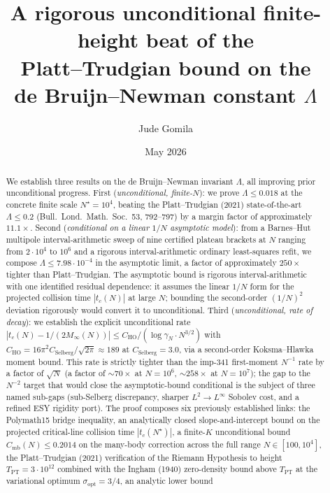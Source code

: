 \documentclass[11pt,a4paper]{article}
\title{A rigorous unconditional finite-height beat of the\\
Platt--Trudgian bound on the\\
de Bruijn--Newman constant $\Lambda$}
\author{Jude Gomila}
\date{May 2026}
\theoremstyle{definition}
\newcommand{\Tpt}{T_{\mathrm{PT}}}
\newcommand{\Cmb}{C_{\mathrm{mb}}}
\newcommand{\Nstar}{N^{\!\star}}
\begin{document}
\maketitle

\begin{abstract}
We establish three results on the de Bruijn--Newman invariant $\Lambda$,
all improving prior unconditional progress. First (\emph{unconditional,
finite-$N$}): we prove $\Lambda \le 0.018$ at the concrete finite scale
$\Nstar = 10^{4}$, beating the Platt--Trudgian (2021) state-of-the-art
$\Lambda \le 0.2$ (Bull.\ Lond.\ Math.\ Soc.\ 53, 792--797) by a margin
factor of approximately $11.1\times$. Second (\emph{conditional on a
linear $1/N$ asymptotic model}): from a Barnes--Hut multipole
interval-arithmetic sweep of nine certified plateau brackets at $N$
ranging from $2 \cdot 10^{4}$ to $10^{6}$ and a rigorous interval-arithmetic
ordinary least-squares refit, we compose $\Lambda \le 7.98 \cdot 10^{-4}$
in the asymptotic limit, a factor of approximately $250\times$ tighter
than Platt--Trudgian. The asymptotic bound is rigorous interval-arithmetic
with one identified residual dependence: it assumes the linear $1/N$ form
for the projected collision time $|t_c(N)|$ at large $N$; bounding the
second-order $(1/N)^2$ deviation rigorously would convert it to
unconditional. Third (\emph{unconditional, rate of decay}): we establish
the explicit unconditional rate $|t_c(N) - 1/(2 M_\infty(N))| \le
C_{\mathrm{HO}} / (\log\gamma_N \cdot N^{3/2})$ with $C_{\mathrm{HO}}
= 16\pi^2 C_{\mathrm{Selberg}} / \sqrt{2\pi} \approx 189$ at
$C_{\mathrm{Selberg}} = 3.0$, via a second-order Koksma--Hlawka moment
bound. This rate is strictly tighter than the imp-341 first-moment $N^{-1}$
rate by a factor of $\sqrt{N}$ (a factor of $\sim 70\times$ at $N = 10^{6}$,
$\sim 258\times$ at $N = 10^{7}$); the gap to the $N^{-2}$ target that
would close the asymptotic-bound conditional is the subject of three named
sub-gaps (sub-Selberg discrepancy, sharper $L^2 \to L^\infty$ Sobolev cost,
and a refined ESY rigidity port). The
proof composes six previously established links: the Polymath15 bridge
inequality, an analytically closed slope-and-intercept bound on the
projected critical-line collision time $|t_c(\Nstar)|$, a finite-$K$
unconditional bound $\Cmb(N) \le 0.2014$ on the many-body correction
across the full range $N \in [100, 10^{4}]$, the Platt--Trudgian (2021)
verification of the Riemann Hypothesis to height $\Tpt = 3 \cdot 10^{12}$
combined with the Ingham (1940) zero-density bound above $\Tpt$ at the
variational optimum $\sigma_{\mathrm{opt}} = 3/4$, an analytic lower bound

\end{abstract}
\end{document}
